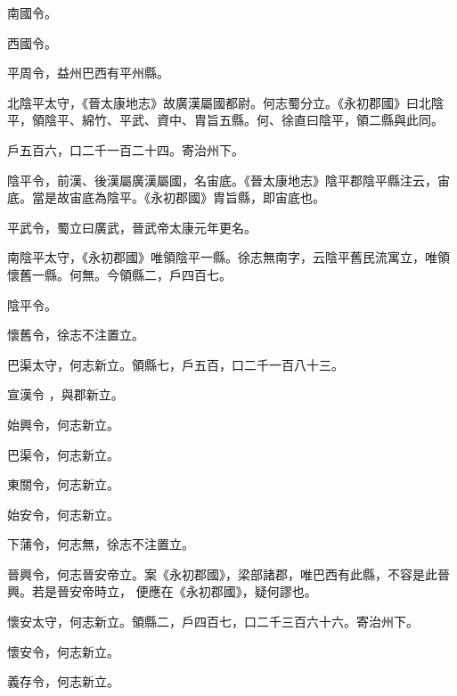 \begin{pinyinscope}
南國令。


西國令。



 平周令，益州巴西有平州縣。



 北陰平太守，《晉太康地志》故廣漢屬國都尉。何志蜀分立。《永初郡國》曰北陰平，領陰平、綿竹、平武、資中、胄旨五縣。何、徐直曰陰平，領二縣與此同。



 戶五百六，口二千一百二十四。寄治州下。


陰平令，前漢、後漢屬廣漢屬國，名宙底。《晉太康地志》陰平郡陰平縣注云，宙底。當是故宙底為陰平。《永初郡國》胄旨縣，即宙底也。



 平武令，蜀立曰廣武，晉武帝太康元年更名。



 南陰平太守，《永初郡國》唯領陰平一縣。徐志無南字，云陰平舊民流寓立，唯領懷舊一縣。何無。今領縣二，戶四百七。



 陰平令。



 懷舊令，徐志不注置立。



 巴渠太守，何志新立。領縣七，戶五百，口二千一百八十三。


宣漢令
 ，與郡新立。



 始興令，何志新立。



 巴渠令，何志新立。



 東關令，何志新立。



 始安令，何志新立。



 下蒲令，何志無，徐志不注置立。



 晉興令，何志晉安帝立。案《永初郡國》，梁部諸郡，唯巴西有此縣，不容是此晉興。若是晉安帝時立，
 便應在《永初郡國》，疑何謬也。



 懷安太守，何志新立。領縣二，戶四百七，口二千三百六十六。寄治州下。



 懷安令，何志新立。



 義存令，何志新立。




\end{pinyinscope}
